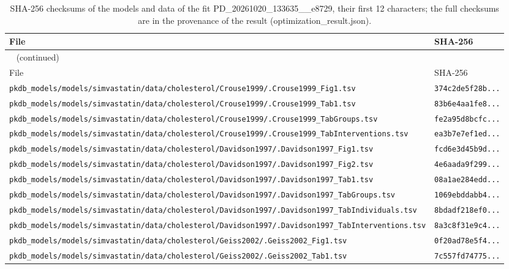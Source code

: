 \begin{longtable}{ll}
\caption{SHA-256 checksums of the models and data of the fit PD\_20261020\_133635\_\_e8729, their first 12 characters; the full checksums are in the provenance of the result (optimization\_result.json).}\label{tab:checksums:PD_20261020_133635__e8729} \\
\toprule
File & SHA-256 \\
\midrule
\endfirsthead
\multicolumn{2}{l}{\small\tablename~\thetable{} (continued)} \\
\toprule
File & SHA-256 \\
\midrule
\endhead
\bottomrule
\endlastfoot
\texttt{pkdb\_models/models/simvastatin/data/cholesterol/Crouse1999/.Crouse1999\_Fig1.tsv} & \texttt{374c2de5f28b...} \\
\texttt{pkdb\_models/models/simvastatin/data/cholesterol/Crouse1999/.Crouse1999\_Tab1.tsv} & \texttt{83b6e4aa1fe8...} \\
\texttt{pkdb\_models/models/simvastatin/data/cholesterol/Crouse1999/.Crouse1999\_TabGroups.tsv} & \texttt{fe2a95d8bcfc...} \\
\texttt{pkdb\_models/models/simvastatin/data/cholesterol/Crouse1999/.Crouse1999\_TabInterventions.tsv} & \texttt{ea3b7e7ef1ed...} \\
\texttt{pkdb\_models/models/simvastatin/data/cholesterol/Davidson1997/.Davidson1997\_Fig1.tsv} & \texttt{fcd6e3d45b9d...} \\
\texttt{pkdb\_models/models/simvastatin/data/cholesterol/Davidson1997/.Davidson1997\_Fig2.tsv} & \texttt{4e6aada9f299...} \\
\texttt{pkdb\_models/models/simvastatin/data/cholesterol/Davidson1997/.Davidson1997\_Tab1.tsv} & \texttt{08a1ae284edd...} \\
\texttt{pkdb\_models/models/simvastatin/data/cholesterol/Davidson1997/.Davidson1997\_TabGroups.tsv} & \texttt{1069ebddabb4...} \\
\texttt{pkdb\_models/models/simvastatin/data/cholesterol/Davidson1997/.Davidson1997\_TabIndividuals.tsv} & \texttt{8bdadf218ef0...} \\
\texttt{pkdb\_models/models/simvastatin/data/cholesterol/Davidson1997/.Davidson1997\_TabInterventions.tsv} & \texttt{8a3c8f31e9c4...} \\
\texttt{pkdb\_models/models/simvastatin/data/cholesterol/Geiss2002/.Geiss2002\_Fig1.tsv} & \texttt{0f20ad78e5f4...} \\
\texttt{pkdb\_models/models/simvastatin/data/cholesterol/Geiss2002/.Geiss2002\_Tab1.tsv} & \texttt{7c557fd74775...} \\

\end{longtable}

